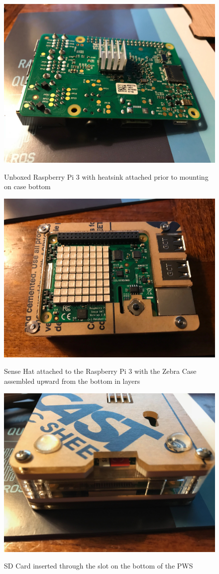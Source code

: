 \documentclass[sigconf]{acmart}
\begin{document}
\begin{figure}[p]
    {\centering
    \includegraphics[width=0.6\columnwidth]{images/RASP3_1.jpg}}
    \caption{Unboxed Raspberry Pi 3 with heatsink attached prior to mounting on case bottom}\label{F:rasp}

\bigskip

    {\centering
    \includegraphics[width=0.6\columnwidth]{images/SENSE_Case1.jpg}}
    \caption{Sense Hat attached to the Raspberry Pi 3 with the Zebra Case assembled upward from the bottom in layers}

\bigskip

    {\centering
    \includegraphics[width=0.6\columnwidth]{images/Bottom_Case.jpg}}
    \caption{SD Card inserted through the slot on the bottom of the PWS}


\end{figure}
\end{document}
